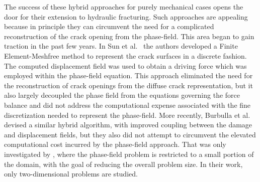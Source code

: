    The success of these hybrid approaches for purely mechanical cases opens the door for their extension to hydraulic fracturing.  Such approaches are appealing because in principle they can circumvent the need for a complicated reconstruction of the crack opening from the phase-field.  This area began to gain traction in the past few years. In Sun et al.\ \cite{sun2020hybrid} the authors developed a Finite Element-Meshfree method to represent the crack surfaces in a discrete fashion. The computed displacement field was used to obtain a driving force which was employed within the phase-field equation. This approach eliminated the need for the reconstruction of crack openings from the diffuse crack representation, but it also largely decoupled the phase field from the equations governing the force balance and did not address the computational expense associated with the fine discretization needed to represent the phase-field. More recently, Burbulla et al. \cite{burbulla2023modeling} devised a similar hybrid algorithm, with improved coupling between the damage and displacement fields, but they also did not attempt to circumvent the elevated computational cost incurred by the phase-field approach. That was only investigated by \cite{zhang2022hybrid}, where the phase-field problem is restricted to a small portion of the domain, with the goal of reducing the overall problem size. In their work, only two-dimensional problems are studied.






